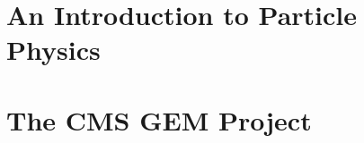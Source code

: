 \documentclass[11pt, twoside, a4paper]{book}
\begin{document}

  \frontmatter

  

  

  

  \tableofcontents
  \cleardoublepage

  


  \mainmatter

  \part{An Introduction to Particle Physics}

    
    \cleardoublepage

    
    \cleardoublepage

    
    \cleardoublepage

    
    \cleardoublepage

    
    \cleardoublepage

  \part{The CMS GEM Project}

    
    \cleardoublepage

    
    \cleardoublepage

    
    \cleardoublepage

    
    \cleardoublepage

    
    \cleardoublepage

    
    \cleardoublepage

    
    \cleardoublepage
\end{document}
